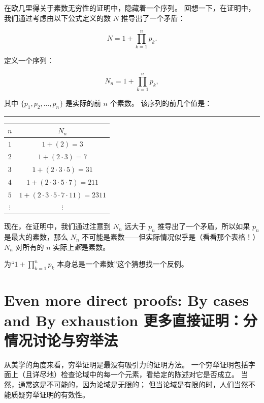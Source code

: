 在欧几里得关于素数无穷性的证明中，隐藏着一个序列。
回想一下，在证明中，我们通过考虑由以下公式定义的数 $N$ 推导出了一个矛盾：

\[  N = 1 + \prod_{k=1}^n p_k.
\]

定义一个序列：

\[  N_n  = 1 + \prod_{k=1}^n p_k, \]

其中 $\{p_1, p_2, \ldots , p_n\}$ 是实际的前 $n$ 个素数。
该序列的前几个值是：

\rule{72pt}{0pt} \begin{tabular}{c|c}
      $n$      & $N_n$                                       \\ \hline
      $1$      & $1+(2) = 3$                                 \\
      $2$      & $1+(2\cdot 3) = 7$                          \\
      $3$      & $1+(2\cdot 3\cdot 5) = 31$                  \\
      $4$      & $1+(2\cdot 3\cdot 5\cdot 7) = 211$          \\
      $5$      & $1+(2\cdot 3\cdot 5\cdot 7\cdot 11) = 2311$ \\
      $\vdots$ & $\vdots$                                    \\
\end{tabular}

现在，在证明中，我们通过注意到 $N_n$ 远大于 $p_n$ 推导出了一个矛盾，所以如果 $p_n$ 是最大的素数，那么 $N_n$ 不可能是素数——但实际情况似乎是（看看那个表格！）$N_n$ 对所有的 $n$ 实际上\emph{都}是素数。

\begin{exer}    
      为“$1+\prod_{k=1}^n p_k$ 本身总是一个素数”这个猜想找一个反例。
\end{exer}


\clearpage





\newpage


\section[By cases and By exhaustion 分情况讨论与穷举法]{Even more direct proofs: By cases and By exhaustion 更多直接证明：分情况讨论与穷举法}
\label{sec:cases}

从美学的角度来看，穷举证明是最没有吸引力的证明方法。
一个穷举证明包括字面上（且详尽地）检查论域中的每一个元素，看给定的陈述对它是否成立。
当然，通常这是不可能的，因为论域是无限的；
但当论域是有限的时，人们当然不能质疑穷举证明的有效性。

